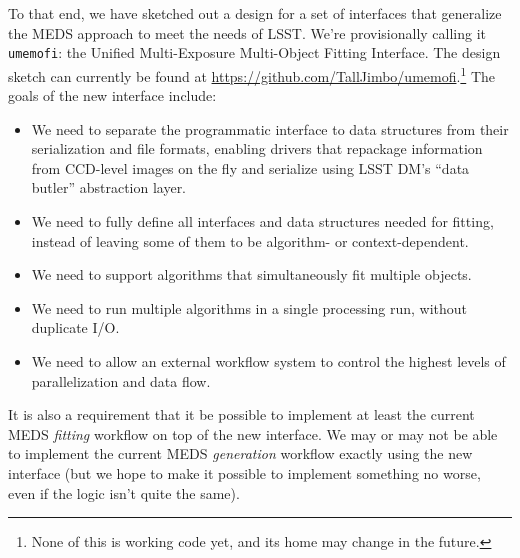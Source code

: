 \documentclass[\docopts]{\docclass}
\begin{document}
To that end, we have sketched out a design for a set of interfaces that generalize the MEDS approach to meet the needs of LSST.  We're provisionally calling it \texttt{umemofi}: the Unified Multi-Exposure Multi-Object Fitting Interface.  The design sketch can currently be found at \url{https://github.com/TallJimbo/umemofi}.\footnote{None of this is working code yet, and its home may change in the future.}  The goals of the new interface include:
\begin{itemize}
\item We need to separate the programmatic interface to data structures from their serialization and file formats, enabling drivers that repackage information from CCD-level images on the fly and serialize using LSST DM's ``data butler'' abstraction layer.
\item We need to fully define all interfaces and data structures needed for fitting, instead of leaving some of them to be algorithm- or context-dependent.
\item We need to support algorithms that simultaneously fit multiple objects.
\item We need to run multiple algorithms in a single processing run, without duplicate I/O.
\item We need to allow an external workflow system to control the highest levels of parallelization and data flow.
\end{itemize}
It is also a requirement that it be possible to implement at least the current MEDS \emph{fitting} workflow on top of the new interface.  We may or may not be able to implement the current MEDS \emph{generation} workflow exactly using the new interface (but we hope to make it possible to implement something no worse, even if the logic isn't quite the same).
\end{document}
